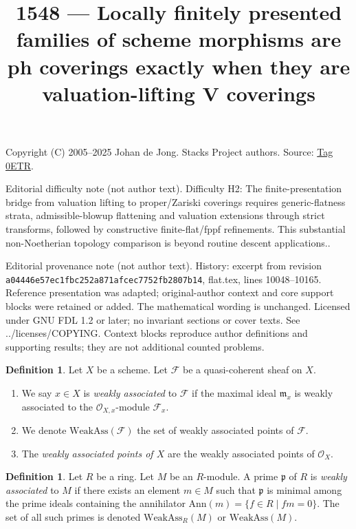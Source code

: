 \documentclass{amsart}
\theoremstyle{plain}
\theoremstyle{definition}
\newtheorem{definition}[subsection]{Definition}
\theoremstyle{remark}
\numberwithin{equation}{subsection}
\begin{document}
\title[Stacks Project, Tag 0ETR]{1548 --- Locally finitely presented families of scheme morphisms are ph coverings exactly when they are valuation-lifting V coverings}
\maketitle
\noindent Copyright (C) 2005--2025 Johan de Jong. Stacks Project authors. Source: \href{https://stacks.math.columbia.edu/tag/0ETR}{Tag 0ETR}.

\noindent Editorial difficulty note (not author text). Difficulty H2: The finite-presentation bridge from valuation lifting to proper/Zariski coverings requires generic-flatness strata, admissible-blowup flattening and valuation extensions through strict transforms, followed by constructive finite-flat/fppf refinements. This substantial non-Noetherian topology comparison is beyond routine descent applications..

\noindent Editorial provenance note (not author text). History: excerpt from revision \texttt{a0444\allowbreak 6e57e\allowbreak c1fbc\allowbreak 252a8\allowbreak 71afc\allowbreak ec775\allowbreak 2fb28\allowbreak 07b14}, flat.tex, lines 10048--10165. Reference presentation was adapted; original-author context and core support blocks were retained or added. The mathematical wording is unchanged. Licensed under GNU FDL 1.2 or later; no invariant sections or cover texts. See ../licenses/COPYING. Context blocks reproduce author definitions and supporting results; they are not additional counted problems.

\begin{definition}
\label{divisors-definition-weakly-associated}
Let $X$ be a scheme.
Let $\mathcal{F}$ be a quasi-coherent sheaf on $X$.
\begin{enumerate}
\item We say $x \in X$ is {\it weakly associated} to $\mathcal{F}$
if the maximal ideal $\mathfrak m_x$ is weakly associated to the
$\mathcal{O}_{X, x}$-module $\mathcal{F}_x$.
\item We denote $\text{WeakAss}(\mathcal{F})$ the set of weakly associated
points of $\mathcal{F}$.
\item The {\it weakly associated points of $X$} are the weakly associated
points of $\mathcal{O}_X$.
\end{enumerate}
\end{definition}

\begin{definition}
\label{algebra-definition-weakly-associated}
Let $R$ be a ring. Let $M$ be an $R$-module.
A prime $\mathfrak p$ of $R$ is {\it weakly associated} to $M$
if there exists an element $m \in M$ such that $\mathfrak p$ is minimal
among the prime ideals containing the annihilator
$\text{Ann}(m) = \{f \in R \mid fm = 0\}$.
The set of all such primes is denoted $\text{WeakAss}_R(M)$
or $\text{WeakAss}(M)$.
\end{definition}
\end{document}
